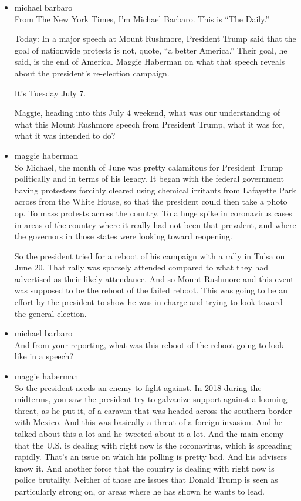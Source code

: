 \begin{itemize}
\item
  michael barbaro\\
  From The New York Times, I'm Michael Barbaro. This is ``The Daily.''

  Today: In a major speech at Mount Rushmore, President Trump said that
  the goal of nationwide protests is not, quote, ``a better America.''
  Their goal, he said, is the end of America. Maggie Haberman on what
  that speech reveals about the president's re-election campaign.

  It's Tuesday July 7.

  Maggie, heading into this July 4 weekend, what was our understanding
  of what this Mount Rushmore speech from President Trump, what it was
  for, what it was intended to do?
\item
  maggie haberman\\
  So Michael, the month of June was pretty calamitous for President
  Trump politically and in terms of his legacy. It began with the
  federal government having protesters forcibly cleared using chemical
  irritants from Lafayette Park across from the White House, so that the
  president could then take a photo op. To mass protests across the
  country. To a huge spike in coronavirus cases in areas of the country
  where it really had not been that prevalent, and where the governors
  in those states were looking toward reopening.

  So the president tried for a reboot of his campaign with a rally in
  Tulsa on June 20. That rally was sparsely attended compared to what
  they had advertised as their likely attendance. And so Mount Rushmore
  and this event was supposed to be the reboot of the failed reboot.
  This was going to be an effort by the president to show he was in
  charge and trying to look toward the general election.
\item
  michael barbaro\\
  And from your reporting, what was this reboot of the reboot going to
  look like in a speech?
\item
  maggie haberman\\
  So the president needs an enemy to fight against. In 2018 during the
  midterms, you saw the president try to galvanize support against a
  looming threat, as he put it, of a caravan that was headed across the
  southern border with Mexico. And this was basically a threat of a
  foreign invasion. And he talked about this a lot and he tweeted about
  it a lot. And the main enemy that the U.S. is dealing with right now
  is the coronavirus, which is spreading rapidly. That's an issue on
  which his polling is pretty bad. And his advisers know it. And another
  force that the country is dealing with right now is police brutality.
  Neither of those are issues that Donald Trump is seen as particularly
  strong on, or areas where he has shown he wants to lead.


\end{itemize}
